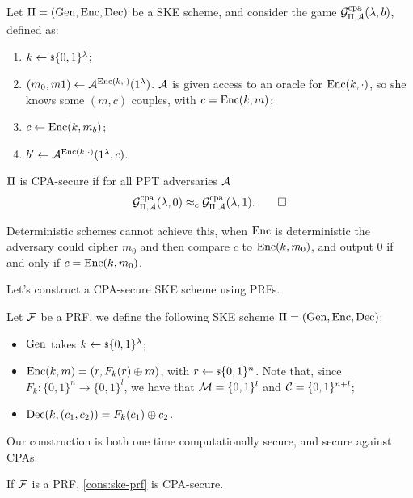 \begin{definition}
	Let $\Pi = \left( \mathrm{Gen} , \allowbreak \mathrm{Enc} , \allowbreak \mathrm{Dec} \right)$ be a \ac{SKE} scheme, and consider the game $\mathcal{G}^{\scriptstyle \text{cpa}}_{\Pi,\mathcal{A}}(\lambda, b)$, defined as:
	\begin{enumerate}
		\item $k \leftarrow {\scriptstyle \$} {\{0,1\}^{\lambda}}$;
		\item $(m_0, m1) \leftarrow \mathcal{A}^{\mathrm{Enc}(k, \cdot)} (1^{\lambda})$.
			$\mathcal{A}$ is given access to an oracle for $\mathrm{Enc}(k, \cdot)$, so she knows some $(m,c)$ couples, with $c = \mathrm{Enc}(k, m)$;
		\item $c \leftarrow \mathrm{Enc}(k, m_b)$;
		\item $b' \leftarrow \mathcal{A}^{\mathrm{Enc}(k, \cdot)}(1^{\lambda}, c)$.
	\end{enumerate}

	$\Pi$ is \ac{CPA}-secure if for all \ac{PPT} adversaries $\mathcal{A}$
	\begin{equation*}
		\mathcal{G}^{\scriptstyle \text{cpa}}_{\Pi,\mathcal{A}}(\lambda, 0) \approx_c \mathcal{G}^{\scriptstyle \text{cpa}}_{\Pi,\mathcal{A}}(\lambda, 1). \qedhere
	\end{equation*}
\end{definition}

Deterministic schemes cannot achieve this, \ie when $\mathrm{Enc}$ is deterministic the adversary could cipher $m_0$ and then compare $c$ to $\mathrm{Enc}(k, m_0)$, and output $0$ if and only if $c = \mathrm{Enc}(k, m_0)$.

Let's construct a \ac{CPA}-secure \ac{SKE} scheme using \acp{PRF}.
\begin{construction} \label{cons:ske-prf}
	Let $\mathcal{F}$ be a \ac{PRF}, we define the following \ac{SKE} scheme $\Pi = \left( \mathrm{Gen} , \allowbreak \mathrm{Enc} , \allowbreak \mathrm{Dec} \right)$:
	\begin{itemize}
		\item $\mathrm{Gen}$ takes $k \leftarrow {\scriptstyle \$} {\{0,1\}^{\lambda}}$;
		\item $\mathrm{Enc}(k,m) = (r, F_k(r) \oplus m)$, with $r \leftarrow {\scriptstyle \$} {\{0,1\}^{n}}$.
			Note that, since $F_k : \{0,1\}^{n} \to \{0,1\}^{l}$, we have that $\mathcal{M} = \{0,1\}^{l}$ and $\mathcal{C} = \{0,1\}^{n+l}$;
		\item $\mathrm{Dec}(k, (c_1, c_2)) = F_k(c_1) \oplus c_2$. \qedhere
	\end{itemize}
\end{construction}

Our construction is both one time computationally secure, and secure against \acp{CPA}.
\begin{theorem} \label{thm:ske-prf-cpa}
	If $\mathcal{F}$ is a \ac{PRF}, \cref{cons:ske-prf} is \ac{CPA}-secure.
\end{theorem}

